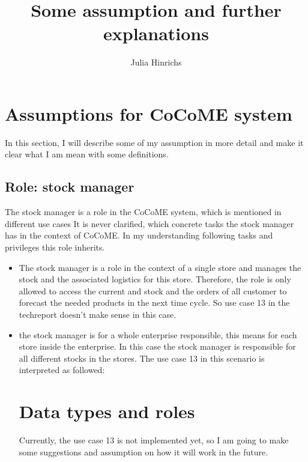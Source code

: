 \documentclass[10pt,a4paper]{article}
\begin{document}
\title{Some assumption and further explanations}
\author{Julia Hinrichs}

\section{Assumptions for CoCoME system}
In this section, I will describe some of my assumption in more detail and make it clear what I am mean with some definitions.
\subsection{Role: stock manager}
The stock manager is a role in the CoCoME system, which is mentioned in different use cases %
It is never clarified, which concrete tasks the stock manager has in the context of CoCoME. In my understanding following tasks and privileges this role inherits.
\begin{itemize}
\item The stock manager is a role in the context of a single store and manages the stock and the associated logistics for this store. Therefore, the role is only allowed to access the current and stock and the orders of all customer to forecast the needed products in the next time cycle. So use case 13 in the techreport doesn't make sense in this case.
\item the stock manager is for a whole enterprise responsible, this means for each store inside the enterprise. In this case the stock manager is responsible for all different stocks in the stores. The use case 13 in this scenario is interpreted as followed: \\


\section{Data types and roles}
Currently, the use case 13 is not implemented yet, so I am going to make some suggestions and assumption on how it will work in the future.
\end{itemize}
\end{document}
